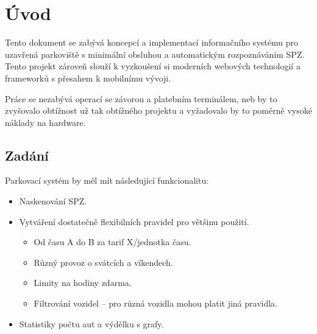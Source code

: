 \chapter{Úvod} \label{uvod}

Tento dokument se zabývá koncepcí a implementací informačního systému pro uzavřená
parkoviště s minimální obsluhou a automatickým rozpoznáváním SPZ.
Tento projekt zároveň slouží k vyzkoušení si moderních webových technologií
a frameworků s přesahem k mobilnímu vývoji.

Práce se nezabývá operací se závorou a platebním terminálem, neb by to zvyšovalo
obtížnost už tak obtížného projektu a vyžadovalo by to poměrně vysoké
náklady na hardware.

\section*{Zadání}

Parkovací systém by měl mít následující funkcionalitu:

\begin{itemize}
  \setlength\itemsep{0.05em}
  \item Naskenování SPZ.
  \item Vytváření dostatečně flexibilních pravidel pro většinu použití.
  \begin{itemize}
    \setlength\itemsep{0.05em}
      \item Od času A do B za tarif X/jednotka času.
      \item Různý provoz o svátcích a víkendech. \label{missing1}
      \item Limity na hodiny zdarma.
      \item Filtrování vozidel -- pro různá vozidla mohou platit jiná pravidla.
    \end{itemize}
  \item Statistiky počtu aut a výdělku s grafy.
\end{itemize}
